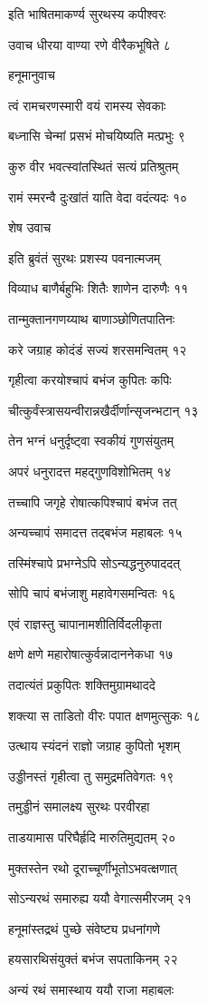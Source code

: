 इति भाषितमाकर्ण्य सुरथस्य कपीश्वरः

उवाच धीरया वाण्या रणे वीरैकभूषिते ८

हनूमानुवाच

त्वं रामचरणस्मारी वयं रामस्य सेवकाः

बध्नासि चेन्मां प्रसभं मोचयिष्यति मत्प्रभुः ९

कुरु वीर भवत्स्वांतस्थितं सत्यं प्रतिश्रुतम्

रामं स्मरन्वै दुःखांतं याति वेदा वदंत्यदः १०

शेष उवाच

इति ब्रुवंतं सुरथः प्रशस्य पवनात्मजम्

विव्याध बाणैर्बहुभिः शितैः शाणेन दारुणैः ११

तान्मुक्तानगणय्याथ बाणाञ्छोणितपातिनः

करे जग्राह कोदंडं सज्यं शरसमन्वितम् १२

गृहीत्वा करयोश्चापं बभंज कुपितः कपिः

चीत्कुर्वंस्त्रासयन्वीरान्नखैर्दीर्णान्सृजन्भटान् १३

तेन भग्नं धनुर्दृष्ट्वा स्वकीयं गुणसंयुतम्

अपरं धनुरादत्त महद्गुणविशोभितम् १४

तच्चापि जगृहे रोषात्कपिश्चापं बभंज तत्

अन्यच्चापं समादत्त तद्बभंज महाबलः १५

तस्मिंश्चापे प्रभग्नेऽपि सोऽन्यद्धनुरुपाददत्

सोपि चापं बभंजाशु महावेगसमन्वितः १६

एवं राज्ञस्तु चापानामशीतिर्विदलीकृता

क्षणे क्षणे महारोषात्कुर्वन्नादाननेकधा १७

तदात्यंतं प्रकुपितः शक्तिमुग्रामथाददे

शक्त्या स ताडितो वीरः पपात क्षणमुत्सुकः १८

उत्थाय स्यंदनं राज्ञो जग्राह कुपितो भृशम्

उड्डीनस्तं गृहीत्वा तु समुद्रमतिवेगतः १९

तमुड्डीनं समालक्ष्य सुरथः परवीरहा

ताडयामास परिघैर्हृदि मारुतिमुद्यतम् २०

मुक्तस्तेन रथो दूराच्चूर्णीभूतोऽभवत्क्षणात्

सोऽन्यरथं समारुह्य ययौ वेगात्समीरजम् २१

हनूमांस्तद्रथं पुच्छे संवेष्ट्य प्रधनांगणे

हयसारथिसंयुक्तं बभंज सपताकिनम् २२

अन्यं रथं समास्थाय ययौ राजा महाबलः

